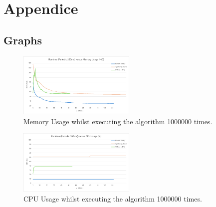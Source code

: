 \onecolumn
\section{Appendice}

\subsection{Graphs}
\label{ssec:graphs}

\begin{figure}[H]
  \caption{Memory Usage whilst executing the algorithm 1000000 times.}
  \label{grf:mem-usage}
  \includegraphics[width=0.5\textwidth]{./img/mem-usage.png}
\end{figure}


\begin{figure}[H]
  \caption{CPU Usage whilst executing the algorithm 1000000 times.}
  \label{grf:cpu-usage}
  \includegraphics[width=0.5\textwidth]{./img/cpu-usage.png}
\end{figure}

